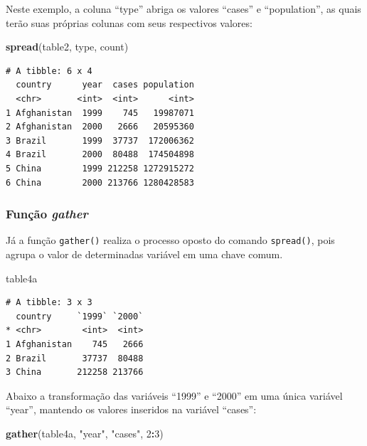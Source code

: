 \documentclass[12pt,brazil,oneside]{book}
\newenvironment{Shaded}{\begin{snugshade}}{\end{snugshade}}
\newcommand{\DecValTok}[1]{\textcolor[rgb]{0.00,0.00,0.81}{#1}}
\newcommand{\KeywordTok}[1]{\textcolor[rgb]{0.13,0.29,0.53}{\textbf{#1}}}
\newcommand{\NormalTok}[1]{#1}
\newcommand{\OperatorTok}[1]{\textcolor[rgb]{0.81,0.36,0.00}{\textbf{#1}}}
\newcommand{\StringTok}[1]{\textcolor[rgb]{0.31,0.60,0.02}{#1}}
\begin{document}
Neste exemplo, a coluna ``type'' abriga os valores ``cases'' e ``population'', as quais terão suas próprias colunas com seus respectivos valores:

\begin{Shaded}
\begin{Highlighting}[]
\KeywordTok{spread}\NormalTok{(table2, type, count)}
\end{Highlighting}
\end{Shaded}

\begin{verbatim}
# A tibble: 6 x 4
  country      year  cases population
  <chr>       <int>  <int>      <int>
1 Afghanistan  1999    745   19987071
2 Afghanistan  2000   2666   20595360
3 Brazil       1999  37737  172006362
4 Brazil       2000  80488  174504898
5 China        1999 212258 1272915272
6 China        2000 213766 1280428583
\end{verbatim}

\hypertarget{funcao-gather}{%
\subsubsection{\texorpdfstring{Função \emph{gather}}{Função gather}}\label{funcao-gather}}

Já a função \texttt{gather()} realiza o processo oposto do comando \texttt{spread()}, pois agrupa o valor de determinadas variável em uma chave comum.

\begin{Shaded}
\begin{Highlighting}[]
\NormalTok{table4a}
\end{Highlighting}
\end{Shaded}

\begin{verbatim}
# A tibble: 3 x 3
  country     `1999` `2000`
* <chr>        <int>  <int>
1 Afghanistan    745   2666
2 Brazil       37737  80488
3 China       212258 213766
\end{verbatim}

Abaixo a transformação das variáveis ``1999'' e ``2000'' em uma única variável ``year'', mantendo os valores inseridos na variável ``cases'':

\begin{Shaded}
\begin{Highlighting}[]
\KeywordTok{gather}\NormalTok{(table4a, }\StringTok{"year"}\NormalTok{, }\StringTok{"cases"}\NormalTok{, }\DecValTok{2}\OperatorTok{:}\DecValTok{3}\NormalTok{)}
\end{Highlighting}
\end{Shaded}
\end{document}

